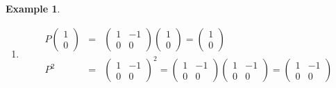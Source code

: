 \documentclass[aps,preprint]{revtex4}
\newtheorem{example}[theorem]{Example}
\begin{document}
\begin{example}
\begin{enumerate}
\begin{enumerate}
\item 
\begin{eqnarray}
P\left( 
\begin{array}{c}
1 \\ 
0%
\end{array}%
\right) &=&\left( 
\begin{array}{cc}
1 & -1 \\ 
0 & 0%
\end{array}%
\right) \left( 
\begin{array}{c}
1 \\ 
0%
\end{array}%
\right) =\left( 
\begin{array}{c}
1 \\ 
0%
\end{array}%
\right) \\
P^{2} &=&\left( 
\begin{array}{cc}
1 & -1 \\ 
0 & 0%
\end{array}%
\right) ^{2}=\left( 
\begin{array}{cc}
1 & -1 \\ 
0 & 0%
\end{array}%
\right) \left( 
\begin{array}{cc}
1 & -1 \\ 
0 & 0%
\end{array}%
\right) =\left( 
\begin{array}{cc}
1 & -1 \\ 
0 & 0%
\end{array}%
\right)
\end{eqnarray}


\end{enumerate}
\end{enumerate}
\end{example}
\end{document}
